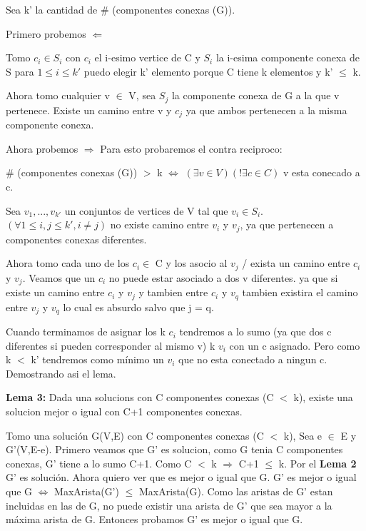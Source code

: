 Sea k' la cantidad de $\#$ (componentes conexas (G)).

Primero probemos $\Leftarrow$

Tomo $c_i \in S_i$ con $c_i$ el i-esimo vertice de C y $S_i$ la i-esima componente conexa de S para $1 \leq i \leq k'$ puedo elegir k' elemento porque C tiene k elementos y k' $\leq$ k.

Ahora tomo cualquier v $\in$ V, sea $S_j$ la componente conexa de G a la que v pertenece. Existe un camino entre v y $c_j$ ya que ambos pertenecen a la misma componente conexa.

Ahora probemos $\Rightarrow$
Para esto probaremos el contra reciproco:

$\#$ (componentes conexas (G)) $>$ k  $\Leftrightarrow$ $(\exists v \in V)(! \exists c \in C)$ v esta conecado a c. 

Sea ${v_1,...,v_{k'}}$ un conjuntos de vertices de V tal que $v_i \in S_i$. $(\forall 1 \leq i,j \leq k', i \neq j)$ no existe camino entre $v_i$ y $v_j$, ya que pertenecen a componentes conexas diferentes.

Ahora tomo cada uno de los $c_i \in$ C y los asocio al $v_j$ / exista un camino entre $c_i$ y $v_j$. Veamos que un $c_i$ no puede estar asociado a dos v diferentes. ya que si existe un camino entre $c_i$ y $v_j$ y tambien entre $c_i$ y $v_q$ tambien existira el camino entre $v_j$ y $v_q$ lo cual es absurdo salvo que j = q.

Cuando terminamos de asignar los k $c_i$ tendremos a lo sumo (ya que dos c diferentes si pueden corresponder al mismo v) k $v_i$ con un c asignado. Pero como k $<$ k' tendremos como mínimo un $v_i$ que no esta conectado a ningun c. Demostrando asi el lema.

\textbf{Lema 3:} Dada una solucions con C componentes conexas (C $<$ k), existe una solucion mejor o igual con C+1 componentes conexas.

Tomo una solución G(V,E) con C componentes conexas (C $<$ k), Sea e $\in$ E y G'(V,E-e).
Primero veamos que G' es solucion, como G tenia C componentes conexas, G' tiene a lo sumo C+1. Como C $<$ k $\Rightarrow$ C+1 $\leq$ k. Por el \textbf{Lema 2} G' es solución. 
Ahora quiero ver que es mejor o igual que G.
G' es mejor o igual que G $\Leftrightarrow$ MaxArista(G') $\leq$ MaxArista(G).
Como las aristas de G' estan incluidas en las de G, no puede existir una arista de G' que sea mayor a la máxima arista de G.
Entonces probamos G' es mejor o igual que G.